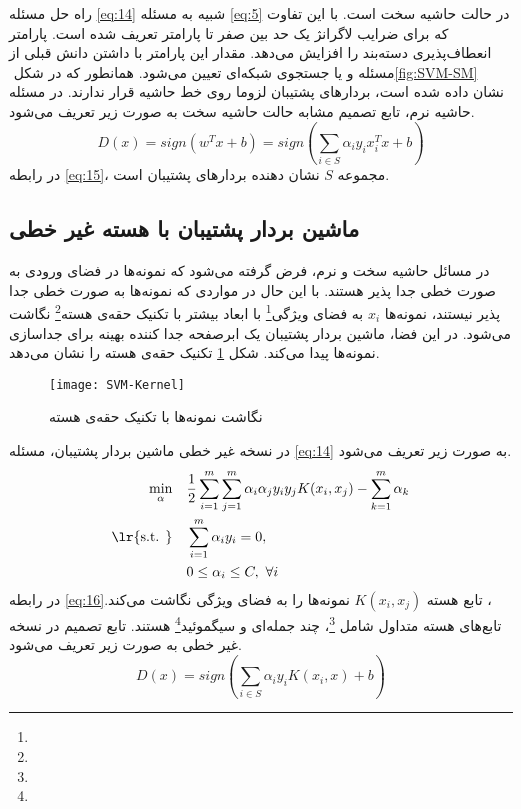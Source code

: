 \indent راه حل مسئله \ref{eq:14} شبیه به مسئله \ref{eq:5} در حالت حاشیه سخت است. با این تفاوت که برای ضرایب لاگرانژ یک حد بین صفر تا پارامتر  تعریف شده است. پارامتر  انعطاف‌پذیری دسته‌بند را افزایش می‌دهد. مقدار این پارامتر با داشتن دانش قبلی از مسئله و یا جستجوی شبکه‌ای تعیین می‌شود. همانطور که در شکل ‏\ref{fig:SVM-SM} نشان داده شده است، بردارهای پشتیبان لزوما روی خط حاشیه قرار ندارند. در مسئله حاشیه نرم، تابع تصمیم مشابه حالت حاشیه سخت به صورت زیر تعریف می‌شود.
\begin{equation}
D(x)=sign({{w}^{T}}x+b) = sign(\sum\limits_{i \in S}{\alpha_{i}y_{i}x_{i}^{T}} x + b)
\label{eq:15}
\end{equation}
در رابطه \ref{eq:15}، مجموعه $S$ نشان دهنده بردارهای پشتیبان است.

\subsection{ماشین بردار پشتیبان با هسته غیر خطی}\label{sec:2:1:3}
در مسائل حاشیه سخت و نرم، فرض گرفته می‌شود که نمونه‌ها در فضای ورودی به صورت خطی جدا پذیر هستند. با این حال در مواردی که نمونه‌ها به صورت خطی جدا پذیر نیستند، نمونه‌ها $x_i$ به فضای ویژگی\footnote{}  با ابعاد بیشتر با تکنیک حقه‌ی هسته\footnote{}  نگاشت می‌شود. در این فضا، ماشین بردار پشتیبان یک ابرصفحه جدا کننده بهینه برای جداسازی نمونه‌ها پیدا می‌کند. شکل \ref{fig:SVM-Ker} تکنیک حقه‌ی هسته را نشان می‌دهد.

\begin{figure}[!t]
	\centering
	\texttt{[image: SVM-Kernel]}
	\caption{نگاشت نمونه‌ها با تکنیک حقه‌ی هسته}
	\label{fig:SVM-Ker}
\end{figure}

در نسخه غیر خطی ماشین بردار پشتیبان، مسئله \ref{eq:14} به صورت زیر تعریف می‌شود.
\begin{equation}
\begin{split} 
\min\limits_{\alpha} \quad &\frac{1}{2}\sum\limits_{i=1}^{m}{\sum\limits_{j=1}^{m}{{{\alpha }_{i}}{{\alpha }_{j}}{{y}_{i}}{{y}_{j}}K(x_{i},{{x}_{j}})-\sum\limits_{k=1}^{m}{{{\alpha }_{k}}}}} \\
\textrm{\lr{s.t. }} \quad &\sum\limits_{i=1}^{m}{\alpha_{i}y_{i}}=0, \\
&0 \le \alpha_{i}\le C,\text{ }\forall i
\end{split}
\label{eq:16}
\end{equation}
در رابطه \ref{eq:16}‏، تابع هسته  $K({{x}_{i}},{{x}_{j}})$ نمونه‌ها را به فضای ویژگی نگاشت می‌کند. تابع‌های هسته متداول شامل  \footnote{}، چند جمله‌ای و سیگموئید\footnote{}  هستند. تابع تصمیم در نسخه غیر خطی به صورت زیر تعریف می‌شود.
\begin{equation}
D(x)= sign(\sum\limits_{i \in S}{\alpha_{i}y_{i}}K(x_{i}, x) + b)
\label{eq:17}
\end{equation}

